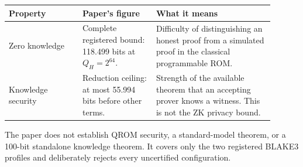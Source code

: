 \documentclass[11pt]{article}
\begin{document}
\begin{center}
\begin{tabular}{@{}>{\raggedright\arraybackslash}p{0.25\linewidth}
                    >{\raggedright\arraybackslash}p{0.25\linewidth}
                    >{\raggedright\arraybackslash}p{0.40\linewidth}@{}}
\toprule
Property & Paper's figure & What it means \\
\midrule
Zero knowledge & Complete registered bound: 118.499 bits at $Q_H=2^{64}$. & Difficulty of distinguishing an honest proof from a simulated proof in the classical programmable ROM. \\
Knowledge security & Reduction ceiling: at most 55.994 bits before other terms. & Strength of the available theorem that an accepting prover knows a witness. This is not the ZK privacy bound. \\
\bottomrule
\end{tabular}
\end{center}

The paper does not establish QROM security, a standard-model theorem, or a
100-bit standalone knowledge theorem. It covers only the two registered
BLAKE3 profiles and deliberately rejects every uncertified configuration.
\end{document}
